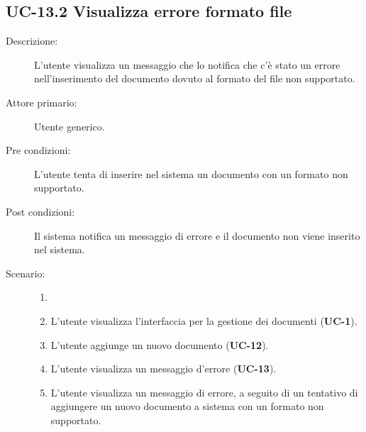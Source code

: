 \subsection{UC-13.2 Visualizza errore formato file}
\begin{description}
    \item[Descrizione:] L'utente visualizza un messaggio che lo notifica che c'è stato un errore nell'inserimento del documento dovuto al formato del file non supportato.
    \item[Attore primario:] Utente generico.
    \item[Pre condizioni:] L'utente tenta di inserire nel sistema un documento con un formato non supportato.
    \item[Post condizioni:] Il sistema notifica un messaggio di errore e il documento non viene inserito nel sistema.
    \item[Scenario:] 
    \begin{enumerate}
        \item[] 
        \item L’utente visualizza l'interfaccia per la gestione dei documenti (\textbf{UC-1}).
        \item L’utente aggiunge un nuovo documento (\textbf{UC-12}).
        \item L'utente visualizza un messaggio d'errore (\textbf{UC-13}).
        \item L'utente visualizza un messaggio di errore, a seguito di un tentativo di aggiungere un nuovo documento a sistema con un formato non supportato.
    \end{enumerate}
\end{description}

